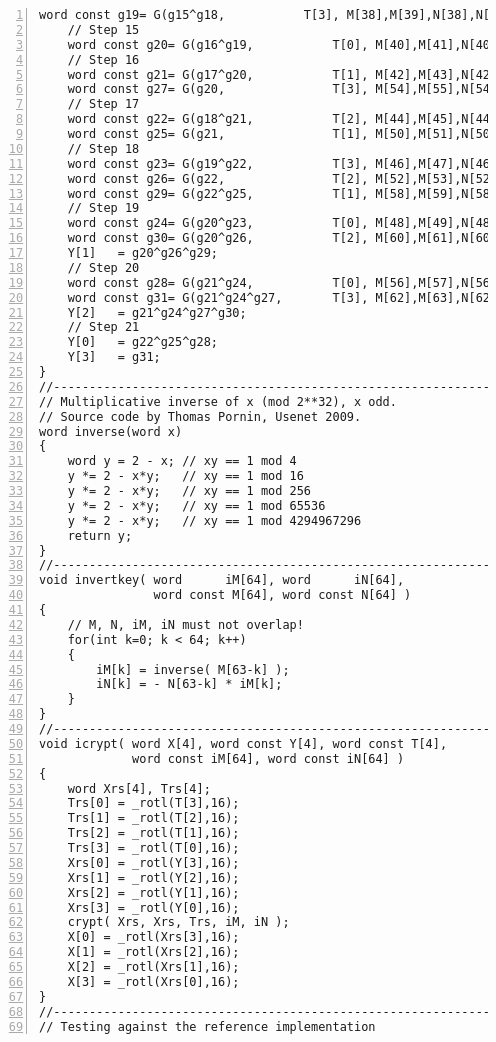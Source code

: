 \documentclass[a4paper,oneside,english]{amsart}
\numberwithin{equation}{section}
\numberwithin{figure}{section}
\begin{document}
\begin{lstlisting}[basicstyle={\scriptsize\ttfamily},numbers=left,tabsize=4]
    word const g19= G(g15^g18,           T[3], M[38],M[39],N[38],N[39]);
    // Step 15
    word const g20= G(g16^g19,           T[0], M[40],M[41],N[40],N[41]);
    // Step 16
    word const g21= G(g17^g20,           T[1], M[42],M[43],N[42],N[43]);
    word const g27= G(g20,               T[3], M[54],M[55],N[54],N[55]);
    // Step 17
    word const g22= G(g18^g21,           T[2], M[44],M[45],N[44],N[45]);
    word const g25= G(g21,               T[1], M[50],M[51],N[50],N[51]);
    // Step 18
    word const g23= G(g19^g22,           T[3], M[46],M[47],N[46],N[47]);
    word const g26= G(g22,               T[2], M[52],M[53],N[52],N[53]);
    word const g29= G(g22^g25,           T[1], M[58],M[59],N[58],N[59]);
    // Step 19
    word const g24= G(g20^g23,           T[0], M[48],M[49],N[48],N[49]);
    word const g30= G(g20^g26,           T[2], M[60],M[61],N[60],N[61]);
    Y[1]   = g20^g26^g29;
    // Step 20
    word const g28= G(g21^g24,           T[0], M[56],M[57],N[56],N[57]);
    word const g31= G(g21^g24^g27,       T[3], M[62],M[63],N[62],N[63]);
    Y[2]   = g21^g24^g27^g30;
    // Step 21
    Y[0]   = g22^g25^g28;
    Y[3]   = g31;
}
//----------------------------------------------------------------------
// Multiplicative inverse of x (mod 2**32), x odd.
// Source code by Thomas Pornin, Usenet 2009.
word inverse(word x)
{
    word y = 2 - x; // xy == 1 mod 4
    y *= 2 - x*y;   // xy == 1 mod 16
    y *= 2 - x*y;   // xy == 1 mod 256
    y *= 2 - x*y;   // xy == 1 mod 65536
    y *= 2 - x*y;   // xy == 1 mod 4294967296
    return y;
}
//----------------------------------------------------------------------
void invertkey( word      iM[64], word      iN[64], 
                word const M[64], word const N[64] )
{
    // M, N, iM, iN must not overlap!
    for(int k=0; k < 64; k++)
    {
        iM[k] = inverse( M[63-k] );
        iN[k] = - N[63-k] * iM[k];
    }
}
//----------------------------------------------------------------------
void icrypt( word X[4], word const Y[4], word const T[4], 
             word const iM[64], word const iN[64] )
{   
    word Xrs[4], Trs[4];
    Trs[0] = _rotl(T[3],16);
    Trs[1] = _rotl(T[2],16);
    Trs[2] = _rotl(T[1],16);
    Trs[3] = _rotl(T[0],16);
    Xrs[0] = _rotl(Y[3],16);
    Xrs[1] = _rotl(Y[2],16);
    Xrs[2] = _rotl(Y[1],16);
    Xrs[3] = _rotl(Y[0],16);
    crypt( Xrs, Xrs, Trs, iM, iN );
    X[0] = _rotl(Xrs[3],16);
    X[1] = _rotl(Xrs[2],16);
    X[2] = _rotl(Xrs[1],16);
    X[3] = _rotl(Xrs[0],16);
}
//----------------------------------------------------------------------
// Testing against the reference implementation

\end{lstlisting}
\end{document}
